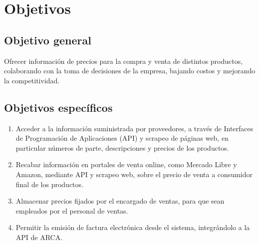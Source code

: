 \section{Objetivos}

\subsection{Objetivo general}

Ofrecer información de precios para la compra y venta de distintos productos,
colaborando con la toma de decisiones de la empresa, bajando costos y mejorando la competitividad.

\subsection{Objetivos específicos}

\begin{enumerate}
	\item Acceder a la información suministrada por proveedores,
	      a través de Interfaces de Programación de Aplicaciones (API) y scrapeo de páginas web,
	      en particular números de parte, descripciones y precios de los productos.
	\item Recabar información en portales de venta online, 
		  como Mercado Libre y Amazon,
		  mediante API y scrapeo web,
	      sobre el precio de venta a consumidor final de los productos.
	\item Almacenar precios fijados por el encargado de ventas,
	      para que sean empleados por el personal de ventas.
	\item Permitir la emisión de factura electrónica desde el sistema,
	      integrándolo a la API de ARCA.
\end{enumerate}
